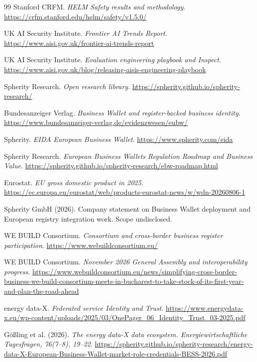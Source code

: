 \begin{thebibliography}{99}
Stanford CRFM. \textit{HELM Safety results and methodology}.
\url{https://crfm.stanford.edu/helm/safety/v1.5.0/}

UK AI Security Institute. \textit{Frontier AI Trends Report}.
\url{https://www.aisi.gov.uk/frontier-ai-trends-report}

UK AI Security Institute. \textit{Evaluation engineering playbook and Inspect}.
\url{https://www.aisi.gov.uk/blog/releasing-aisis-engineering-playbook}

Spherity Research. \textit{Open research library}.
\url{https://spherity.github.io/spherity-research/}

Bundesanzeiger Verlag. \textit{Business Wallet and register-backed business identity}.
\url{https://www.bundesanzeiger-verlag.de/evidenzwesen/eubw/}

Spherity. \textit{EIDA European Business Wallet}.
\url{https://www.spherity.com/eida}

Spherity Research. \textit{European Business Wallets Regulation Roadmap and Business Value}.
\url{https://spherity.github.io/spherity-research/ebw-roadmap.html}

Eurostat. \textit{EU gross domestic product in 2025}.
\url{https://ec.europa.eu/eurostat/web/products-eurostat-news/w/wdn-20260806-1}

Spherity GmbH (2026). Company statement on Business Wallet deployment and European registry integration work. Scope undisclosed.

WE BUILD Consortium. \textit{Consortium and cross-border business register participation}.
\url{https://www.webuildconsortium.eu/}

WE BUILD Consortium. \textit{November 2026 General Assembly and interoperability progress}.
\url{https://www.webuildconsortium.eu/news/simplifying-cross-border-business-we-build-consortium-meets-in-bucharest-to-take-stock-of-its-first-year-and-plan-the-road-ahead}

energy data-X. \textit{Federated service Identity and Trust}.
\url{https://www.energydata-x.eu/wp-content/uploads/2025/03/OnePager_06_Identity_Trust_03-2025.pdf}

Gößling et al. (2026). \textit{The energy data-X data ecosystem. Energiewirtschaftliche Tagesfragen, 76(7--8), 19--22}.
\url{https://spherity.github.io/spherity-research/energy-data-X-European-Business-Wallet-market-role-credentials-BESS-2026.pdf}


\end{thebibliography}

